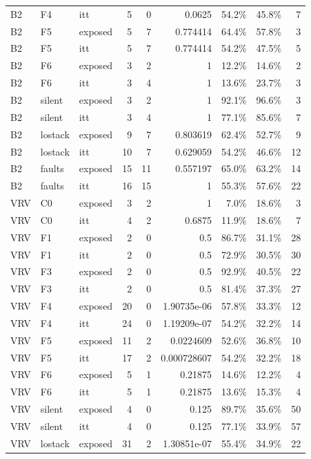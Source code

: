 \begin{tabular}{lllrrrrrr}
B2 & F4 & itt & 5 & 0 & 0.0625 & 54.2\% & 45.8\% & 7 \\
B2 & F5 & exposed & 5 & 7 & 0.774414 & 64.4\% & 57.8\% & 3 \\
B2 & F5 & itt & 5 & 7 & 0.774414 & 54.2\% & 47.5\% & 5 \\
B2 & F6 & exposed & 3 & 2 & 1 & 12.2\% & 14.6\% & 2 \\
B2 & F6 & itt & 3 & 4 & 1 & 13.6\% & 23.7\% & 3 \\
B2 & silent & exposed & 3 & 2 & 1 & 92.1\% & 96.6\% & 3 \\
B2 & silent & itt & 3 & 4 & 1 & 77.1\% & 85.6\% & 7 \\
B2 & lostack & exposed & 9 & 7 & 0.803619 & 62.4\% & 52.7\% & 9 \\
B2 & lostack & itt & 10 & 7 & 0.629059 & 54.2\% & 46.6\% & 12 \\
B2 & faults & exposed & 15 & 11 & 0.557197 & 65.0\% & 63.2\% & 14 \\
B2 & faults & itt & 16 & 15 & 1 & 55.3\% & 57.6\% & 22 \\
VRV & C0 & exposed & 3 & 2 & 1 & 7.0\% & 18.6\% & 3 \\
VRV & C0 & itt & 4 & 2 & 0.6875 & 11.9\% & 18.6\% & 7 \\
VRV & F1 & exposed & 2 & 0 & 0.5 & 86.7\% & 31.1\% & 28 \\
VRV & F1 & itt & 2 & 0 & 0.5 & 72.9\% & 30.5\% & 30 \\
VRV & F3 & exposed & 2 & 0 & 0.5 & 92.9\% & 40.5\% & 22 \\
VRV & F3 & itt & 2 & 0 & 0.5 & 81.4\% & 37.3\% & 27 \\
VRV & F4 & exposed & 20 & 0 & 1.90735e-06 & 57.8\% & 33.3\% & 12 \\
VRV & F4 & itt & 24 & 0 & 1.19209e-07 & 54.2\% & 32.2\% & 14 \\
VRV & F5 & exposed & 11 & 2 & 0.0224609 & 52.6\% & 36.8\% & 10 \\
VRV & F5 & itt & 17 & 2 & 0.000728607 & 54.2\% & 32.2\% & 18 \\
VRV & F6 & exposed & 5 & 1 & 0.21875 & 14.6\% & 12.2\% & 4 \\
VRV & F6 & itt & 5 & 1 & 0.21875 & 13.6\% & 15.3\% & 4 \\
VRV & silent & exposed & 4 & 0 & 0.125 & 89.7\% & 35.6\% & 50 \\
VRV & silent & itt & 4 & 0 & 0.125 & 77.1\% & 33.9\% & 57 \\
VRV & lostack & exposed & 31 & 2 & 1.30851e-07 & 55.4\% & 34.9\% & 22 \\

\end{tabular}
